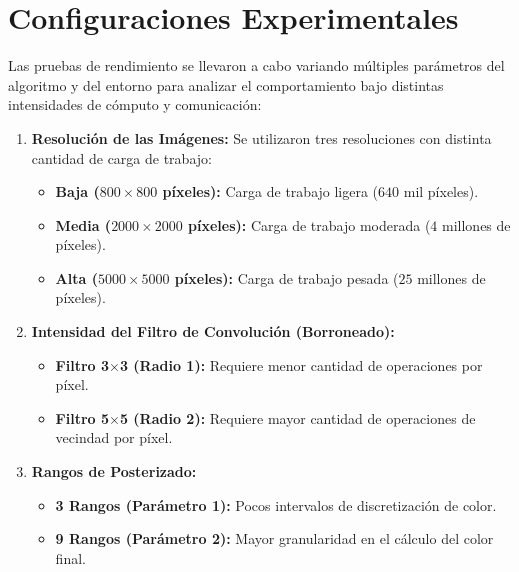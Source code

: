 \section{Configuraciones Experimentales}

Las pruebas de rendimiento se llevaron a cabo variando múltiples parámetros del algoritmo y del entorno para analizar 
el comportamiento bajo distintas intensidades de cómputo y comunicación:

\begin{enumerate}
    \item \textbf{Resolución de las Imágenes:} Se utilizaron tres resoluciones con distinta cantidad de carga de trabajo:
    \begin{itemize}
        \item \textbf{Baja ($800 \times 800$ píxeles):} Carga de trabajo ligera ($640$ mil píxeles).
        \item \textbf{Media ($2000 \times 2000$ píxeles):} Carga de trabajo moderada ($4$ millones de píxeles).
        \item \textbf{Alta ($5000 \times 5000$ píxeles):} Carga de trabajo pesada ($25$ millones de píxeles).
    \end{itemize}
    
    \item \textbf{Intensidad del Filtro de Convolución (Borroneado):}
    \begin{itemize}
        \item \textbf{Filtro 3$\times$3 (Radio 1):} Requiere menor cantidad de operaciones por píxel.
        \item \textbf{Filtro 5$\times$5 (Radio 2):} Requiere mayor cantidad de operaciones de vecindad por píxel.
    \end{itemize}
    
    \item \textbf{Rangos de Posterizado:}
    \begin{itemize}
        \item \textbf{3 Rangos (Parámetro 1):} Pocos intervalos de discretización de color.
        \item \textbf{9 Rangos (Parámetro 2):} Mayor granularidad en el cálculo del color final.
    \end{itemize}


\end{enumerate}
